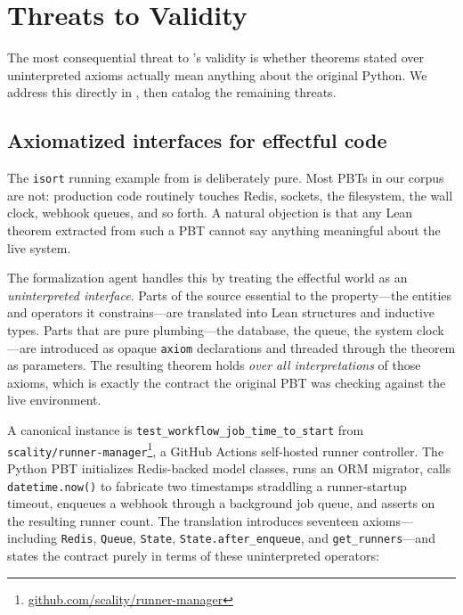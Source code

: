 \section{Threats to Validity}

The most consequential threat to \FVSpec's validity is whether theorems stated over uninterpreted axioms actually mean anything about the original Python. We address this directly in , then catalog the remaining threats.

\subsection{Axiomatized interfaces for effectful code}
\label{sec:threats-axioms}

The \texttt{isort} running example from  is deliberately pure. Most PBTs in our corpus are not: production code routinely touches Redis, sockets, the filesystem, the wall clock, webhook queues, and so forth. A natural objection is that any Lean theorem extracted from such a PBT cannot say anything meaningful about the live system.

The formalization agent handles this by treating the effectful world as an \emph{uninterpreted interface}. Parts of the source essential to the property---the entities and operators it constrains---are translated into Lean structures and inductive types. Parts that are pure plumbing---the database, the queue, the system clock---are introduced as opaque \texttt{axiom} declarations and threaded through the theorem as parameters. The resulting theorem holds \emph{over all interpretations} of those axioms, which is exactly the contract the original PBT was checking against the live environment.

A canonical instance is \texttt{test\_workflow\_job\_time\_to\_start} from \texttt{scality/runner-manager}\footnote{\href{https://github.com/scality/runner-manager}{github.com/scality/runner-manager}}, a GitHub Actions self-hosted runner controller. The Python PBT initializes Redis-backed model classes, runs an ORM migrator, calls \texttt{datetime.now()} to fabricate two timestamps straddling a runner-startup timeout, enqueues a webhook through a background job queue, and asserts on the resulting runner count. The \FVSpec translation introduces seventeen axioms---including \texttt{Redis}, \texttt{Queue}, \texttt{State}, \texttt{State.after\_enqueue}, and \texttt{get\_runners}---and states the contract purely in terms of these uninterpreted operators:

